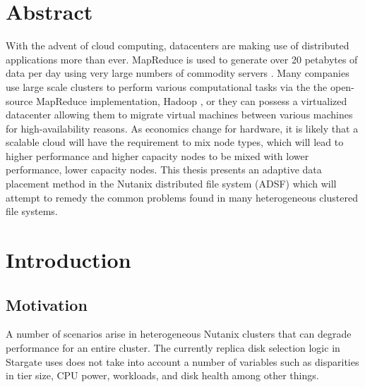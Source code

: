 \documentclass[12pt]{article}
\begin{document}
\author{Cyril Allen\\
Harvard Extension School}
\renewcommand{\today}{who knows}


\tableofcontents

\listoffigures

\listoftables

\section{Abstract}

With the advent of cloud computing, datacenters are making use of distributed
applications more than ever. MapReduce is used to generate over 20 petabytes of
data per day using very large numbers of commodity servers \cite{mapreduce}. Many companies
use large scale clusters to perform various computational tasks via the the
open-source MapReduce implementation, Hadoop \cite{hadoop}, or they can possess a
virtualized datacenter allowing them to migrate virtual machines between
various machines for high-availability reasons. As economics change for
hardware, it is likely that a scalable cloud will have the requirement to mix
node types, which will lead to higher performance and higher capacity nodes to
be mixed with lower performance, lower capacity nodes. This thesis presents an
adaptive data placement method in the Nutanix distributed file system (ADSF)
which will attempt to remedy the common problems found in many heterogeneous
clustered file systems.

\section{Introduction}

  \subsection{Motivation}

  A number of scenarios arise in heterogeneous Nutanix clusters that can
  degrade performance for an entire cluster. The currently replica disk
  selection logic in Stargate uses does not take into account a number of
  variables such as disparities in tier size, CPU power, workloads, and disk
  health among other things.
\end{document}
